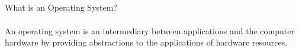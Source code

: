 \subsection*{}
What is an Operating System?
    \paragraph*{}
    An operating system is an intermediary between applications and the computer hardware by providing abstractions to the applications of hardware resources.